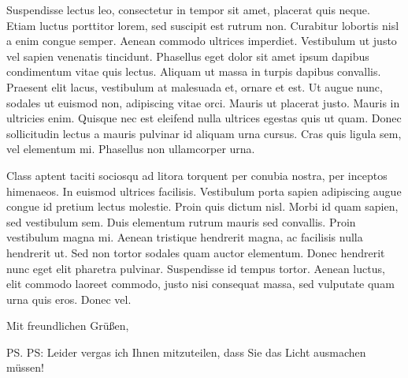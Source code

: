 \documentclass[version=last, fontsize=12pt]{scrlttr2}   %
\begin{document}
\begin{letter}
Suspendisse lectus leo, consectetur in tempor sit amet, placerat quis neque. Etiam luctus porttitor lorem, sed suscipit est rutrum non. Curabitur lobortis nisl a enim congue semper. Aenean commodo ultrices imperdiet. Vestibulum ut justo vel sapien venenatis tincidunt. Phasellus eget dolor sit amet ipsum dapibus condimentum vitae quis lectus. Aliquam ut massa in turpis dapibus convallis. Praesent elit lacus, vestibulum at malesuada et, ornare et est. Ut augue nunc, sodales ut euismod non, adipiscing vitae orci. Mauris ut placerat justo. Mauris in ultricies enim. Quisque nec est eleifend nulla ultrices egestas quis ut quam. Donec sollicitudin lectus a mauris pulvinar id aliquam urna cursus. Cras quis ligula sem, vel elementum mi. Phasellus non ullamcorper urna.

Class aptent taciti sociosqu ad litora torquent per conubia nostra, per inceptos himenaeos. In euismod ultrices facilisis. Vestibulum porta sapien adipiscing augue congue id pretium lectus molestie. Proin quis dictum nisl. Morbi id quam sapien, sed vestibulum sem. Duis elementum rutrum mauris sed convallis. Proin vestibulum magna mi. Aenean tristique hendrerit magna, ac facilisis nulla hendrerit ut. Sed non tortor sodales quam auctor elementum. Donec hendrerit nunc eget elit pharetra pulvinar. Suspendisse id tempus tortor. Aenean luctus, elit commodo laoreet commodo, justo nisi consequat massa, sed vulputate quam urna quis eros. Donec vel.

\closing{Mit freundlichen Grüßen,}

\ps PS: Leider vergas ich Ihnen mitzuteilen, dass Sie das Licht ausmachen müssen!


\end{letter}
\end{document}
